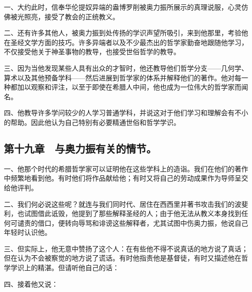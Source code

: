 一、大约此时，信奉华伦提奴异端的盎博罗削被奥力振所展示的真理说服，心灵仿佛被光照亮，接受了教会的正统教义。\par

二、还有许多其他人，被奥力振到处传扬的学识声望所吸引，来到他那里，考验他在圣经文学方面的技巧。许多异端者以及不少最杰出的哲学家勤奋地跟随他学习，不仅接受他关于神圣事物的教导，也接受世俗哲学的教导。\par

三、因为当他发现某些人具有出众的才智时，他还教导他们哲学分支——几何学、算术以及其他预备学科——然后进展到哲学家的体系并解释他们的著作。他对每一种都加以观察和评注，以至于即使在希腊人中间，他也成为一位伟大的哲学家而闻名。\par

四、他教导许多学问较少的人学习普通学科，并说这对于他们学习和理解会有不小的帮助。因此他认为自己特别有必要精通世俗和哲学学识。\par


\subsection{第十九章　与奥力振有关的情节。}

一、他那个时代的希腊哲学家可以证明他在这些学科上的造诣。我们在他们的著作中频繁地看到他。有时他们将作品献给他；有时又将自己的劳动成果作为导师呈交给他评判。\par

二、我们何必说这些呢？就连与我们同时代、居住在西西里并著书攻击我们的波斐利，也试图借此诋毁，他提到了那些解释圣经的人；由于他无法从教义本身找到任何可谴责的借口，便转向辱骂和诽谤这些解释者，尤其试图中伤奥力振，他说自己年轻时认识他。\par

三、但实际上，他无意中赞扬了这个人：在有些他不得不说真话的地方说了真话；但在认为不会被察觉的地方说了谎话。有时他指责他是基督徒，有时又描述他在哲学学识上的精湛。但请听他自己的话：\par

四、接着他又说：\par

